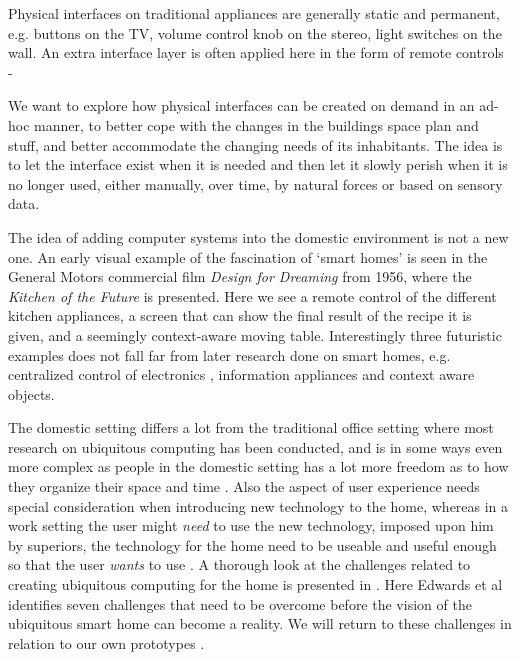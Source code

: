 Physical interfaces on traditional appliances are generally static and permanent, e.g. buttons on the TV, volume control knob on the stereo, light switches on the wall. 
An extra interface layer is often applied here in the form of remote controls -  

We want to explore how physical interfaces can be created on demand in an ad-hoc manner, to better cope with the changes in the buildings space plan and stuff, and better accommodate the changing needs of its inhabitants.
The idea is to let the interface exist when it is needed and then let it slowly perish when it is no longer used, either manually, over time, by natural forces or based on sensory data.

The idea of adding computer systems into the domestic environment is not a new one. An early visual example of the fascination of `smart homes' is seen in the General Motors commercial film \emph{Design for Dreaming} from 1956, where the \emph{Kitchen of the Future} is presented.
Here we see a remote control of the different kitchen appliances, a screen that can show the final result of the recipe it is given, and a seemingly context-aware moving table.
Interestingly three futuristic examples does not fall far from later research done on smart homes, e.g. centralized control of electronics , information appliances  and context aware objects.


The domestic setting differs a lot from the traditional office setting where most research on ubiquitous computing has been conducted, and is in some ways even more complex as people in the domestic setting has a lot more freedom as to how they organize their space and time \cite{meyer2003survey}.
Also the aspect of user experience needs special consideration when introducing new technology to the home, whereas in a work setting the user might \emph{need} to use the new technology, imposed upon him by superiors, the technology for the home need to be useable and useful enough so that the user \emph{wants} to use \cite{meyer2003survey}.
A thorough look at the challenges related to creating ubiquitous computing for the home is presented in \cite{edwards2001home}.
Here Edwards et al identifies seven challenges that need to be overcome before the vision of the ubiquitous smart home can become a reality. We will return to these challenges in relation to our own prototypes .

